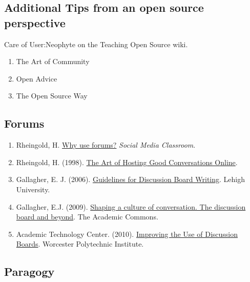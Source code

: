 \hypertarget{additional-tips-from-an-open-source-perspective}{%
\subsection{Additional Tips from an open source
perspective}\label{additional-tips-from-an-open-source-perspective}}

Care of User:Neophyte on the Teaching Open Source wiki.

\begin{enumerate}
\def\labelenumi{\arabic{enumi}.}
\item
  The Art of Community
\item
  Open Advice
\item
  The Open Source Way
\end{enumerate}

\hypertarget{forums}{%
\subsection{Forums}\label{forums}}

\begin{enumerate}
\def\labelenumi{\arabic{enumi}.}
\item
  Rheingold, H. \href{http://blip.tv/file/1123048}{Why use forums?}
  \emph{Social Media Classroom}.
\item
  Rheingold, H. (1998).
  \href{http://www.rheingold.com/texts/artonlinehost.html}{The Art of
  Hosting Good Conversations Online}.
\item
  Gallagher, E. J. (2006).
  \href{http://www.lehigh.edu/~indiscus/doc_guidelines.html}{Guidelines
  for Discussion Board Writing}. Lehigh University.
\item
  Gallagher, E.J. (2009).
  \href{http://www.academiccommons.org/2009/01/shaping-a-culture-of-conversation-the-discussion-board-and-beyond/}{Shaping
  a culture of conversation. The discussion board and beyond}. The
  Academic Commons.
\item
  Academic Technology Center. (2010).
  \href{http://www.wpi.edu/Academics/ATC/Collaboratory/Idea/boards.html}{Improving
  the Use of Discussion Boards}. Worcester Polytechnic Institute.
\end{enumerate}

\hypertarget{paragogy}{%
\subsection{Paragogy}\label{paragogy}}

